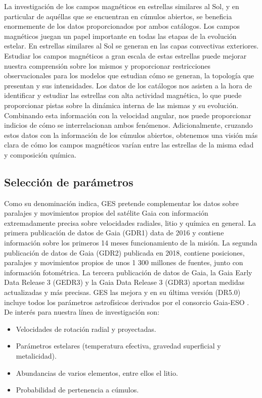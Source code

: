 La investigación de los campos magnéticos en estrellas similares al Sol, y en particular de aquéllas que se encuentran en cúmulos abiertos, se beneficia enormemente de los datos proporcionados por ambos catálogos. Los campos magnéticos juegan un papel importante en todas las etapas de la evolución estelar. En estrellas similares al Sol se generan en las capas convectivas exteriores. Estudiar los campos magnéticos a gran escala de estas estrellas puede mejorar nuestra comprensión sobre los mismos y proporcionar restricciones observacionales para los modelos que estudian cómo se generan, la topología que presentan y sus intensidades. Los datos de los catálogos nos asisten a la hora de identificar y estudiar las estrellas con alta actividad magnética, lo que puede proporcionar pistas sobre la dinámica interna de las mismas y su evolución. Combinando esta información con la velocidad angular, nos puede proporcionar indicios de cómo se interrelacionan ambos fenómenos. Adicionalmente, cruzando estos datos con la información de los cúmulos abiertos, obtenemos una visión más clara de cómo los campos magnéticos varían entre las estrellas de la misma edad y composición química.\par


\subsection{Selección de parámetros}
Como su denominación indica, GES pretende complementar los datos sobre paralajes y movimientos propios del satélite Gaia con información extremadamente precisa sobre velocidades radiales, litio y química en general. La primera publicación de datos de Gaia (GDR1) \citep{Brown2016} data de 2016 y contiene información sobre los primeros 14 meses funcionamiento de la misión. La segunda publicación de datos de Gaia (GDR2) \citep{Brown2018} publicada en 2018, contiene posiciones, paralajes y movimientos propios de unos 1 300 millones de fuentes, junto con información fotométrica. La tercera publicación de datos de Gaia, la Gaia Early Data Release 3 (GEDR3) \citep{Brown2021} y la Gaia Data Release 3 (GDR3) \citep{Brown2022} aportan medidas actualizadas y más precisas. GES las mejora y en su última versión (DR5.0) incluye todos los parámetros astrofísicos derivados por el consorcio Gaia-ESO \citep{Gilmore2022}. De interés para nuestra línea de investigación son:
\begin{itemize}
	\item Velocidades de rotación radial y proyectadas.
	\item Parámetros estelares (temperatura efectiva, gravedad superficial y metalicidad).
	\item Abundancias de varios elementos, entre ellos el litio.
	\item Probabilidad de pertenencia a cúmulos.
\end{itemize}


